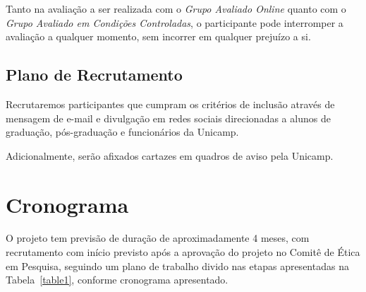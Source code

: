 \documentclass[a4paper,11pt,titlepage,singlespacing]{article}
\begin{document}
\noindent Tanto na avaliação a ser realizada com o \textit{Grupo Avaliado Online} quanto com o \textit{Grupo Avaliado em Condições Controladas}, o participante pode interromper a avaliação a qualquer momento, sem incorrer em qualquer prejuízo a si.


\subsection{Plano de Recrutamento}

\noindent Recrutaremos participantes que cumpram os critérios de inclusão através de mensagem de e-mail e divulgação em redes sociais direcionadas a alunos de graduação, pós-graduação e funcionários da Unicamp.

Adicionalmente, serão afixados cartazes em quadros de aviso pela Unicamp.

\section{Cronograma}
\noindent O projeto tem previsão de duração de aproximadamente 4 meses, com recrutamento com início previsto após a aprovação do projeto no Comitê de Ética em Pesquisa, seguindo um plano de trabalho divido nas etapas apresentadas na Tabela~\ref{table1}, conforme cronograma apresentado.
\end{document}
